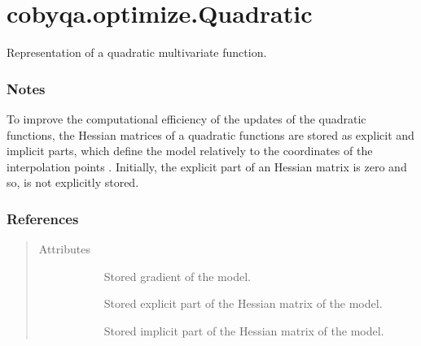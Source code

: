 \documentclass[letterpaper,10pt,english]{sphinxmanual}
\begin{document}
\section{cobyqa.optimize.Quadratic}
\label{\detokenize{refs/generated/cobyqa.optimize.Quadratic:cobyqa-optimize-quadratic}}\label{\detokenize{refs/generated/cobyqa.optimize.Quadratic::doc}}

\begin{fulllineitems}
\label{\detokenize{refs/generated/cobyqa.optimize.Quadratic:cobyqa.optimize.Quadratic}}
\sphinxAtStartPar
Representation of a quadratic multivariate function.
\subsubsection*{Notes}

\sphinxAtStartPar
To improve the computational efficiency of the updates of the quadratic
functions, the Hessian matrices of a quadratic functions are stored as
explicit and implicit parts, which define the model relatively to the
coordinates of the interpolation points . Initially, the explicit
part of an Hessian matrix is zero and so, is not explicitly stored.
\subsubsection*{References}

\sphinxAtStartPar
{}
\begin{quote}\begin{description}
\item[{Attributes}] \leavevmode\begin{description}
\item[{}] \leavevmode
\sphinxAtStartPar
Stored gradient of the model.

\item[{}] \leavevmode
\sphinxAtStartPar
Stored explicit part of the Hessian matrix of the model.

\item[{}] \leavevmode
\sphinxAtStartPar
Stored implicit part of the Hessian matrix of the model.


\end{description}
\end{description}
\end{quote}
\end{fulllineitems}
\end{document}
